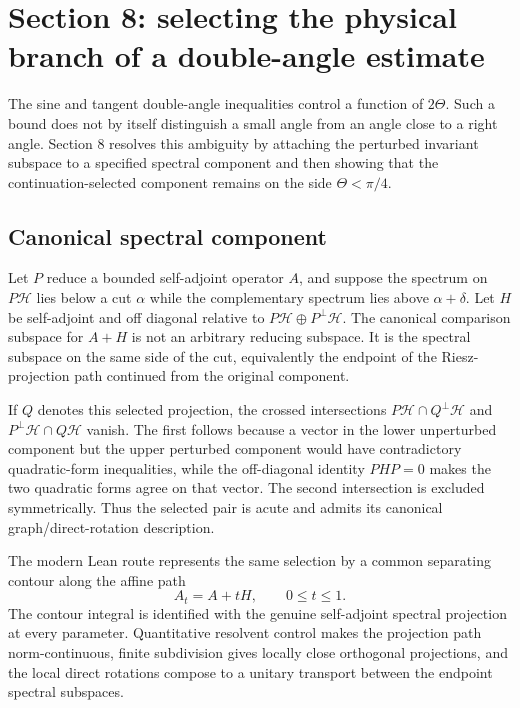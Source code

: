 
\section{Section 8: selecting the physical branch of a double-angle estimate}

The sine and tangent double-angle inequalities control a function of
$2\Theta$.  Such a bound does not by itself distinguish a small angle from an
angle close to a right angle.  Section 8 resolves this ambiguity by attaching
the perturbed invariant subspace to a specified spectral component and then
showing that the continuation-selected component remains on the side
$\Theta<\pi/4$.

\subsection{Canonical spectral component}

Let $P$ reduce a bounded self-adjoint operator $A$, and suppose the spectrum on
$P\mathcal H$ lies below a cut $\alpha$ while the complementary spectrum lies
above $\alpha+\delta$.  Let $H$ be self-adjoint and off diagonal relative to
$P\mathcal H\oplus P^\perp\mathcal H$.  The canonical comparison subspace for
$A+H$ is not an arbitrary reducing subspace.  It is the spectral subspace on
the same side of the cut, equivalently the endpoint of the Riesz-projection
path continued from the original component.

If $Q$ denotes this selected projection, the crossed intersections
$P\mathcal H\cap Q^\perp\mathcal H$ and
$P^\perp\mathcal H\cap Q\mathcal H$ vanish.  The first follows because a vector
in the lower unperturbed component but the upper perturbed component would
have contradictory quadratic-form inequalities, while the off-diagonal
identity $PHP=0$ makes the two quadratic forms agree on that vector.  The
second intersection is excluded symmetrically.  Thus the selected pair is
acute and admits its canonical graph/direct-rotation description.

The modern Lean route represents the same selection by a common separating
contour along the affine path
\[
 A_t=A+tH,\qquad 0\le t\le1.
\]
The contour integral is identified with the genuine self-adjoint spectral
projection at every parameter.  Quantitative resolvent control makes the
projection path norm-continuous, finite subdivision gives locally close
orthogonal projections, and the local direct rotations compose to a unitary
transport between the endpoint spectral subspaces.

